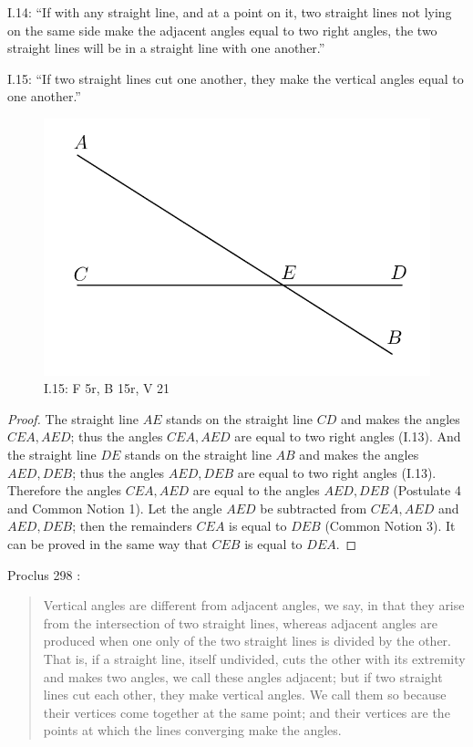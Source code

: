 \documentclass{article}
\begin{document}
I.14: ``If with any straight line, and at a point on it, two straight lines
not lying on the same side make the adjacent angles equal to
two right angles, the two straight lines will be in a straight line with one another.''

I.15: ``If two straight lines cut one another, they make the vertical
angles equal to one another.''

\begin{figure}
\begin{center}
\includegraphics[width=\textwidth]{I15.png}
\end{center}
\caption{I.15: F 5r, B 15r, V 21}
\label{I15}
\end{figure}

\begin{proof}
The straight line $AE$ stands on the straight line $CD$ and makes the angles
$CEA,AED$; thus the angles $CEA,AED$ are equal to two right angles (I.13).
And the straight line $DE$ stands on the straight line $AB$ and makes the angles
$AED,DEB$; thus the angles $AED,DEB$ are equal to two right angles (I.13).
Therefore the angles $CEA,AED$ are equal to the angles $AED,DEB$ (Postulate 4 and Common Notion 1).
Let the angle $AED$ be subtracted from $CEA,AED$ and $AED,DEB$; then the remainders
$CEA$ is equal to $DEB$ (Common Notion 3).
It can be proved in the same way that  $CEB$ is equal to $DEA$.
\end{proof}

Proclus 298 \cite[p.~233]{proclus}:

\begin{quote}
Vertical angles are different from adjacent angles, we say,
in that they arise from the intersection of two straight lines,
whereas adjacent angles are produced when one only of the
two straight lines is divided by the other. That is, if a straight
line, itself undivided, cuts the other with its extremity and
makes two angles, we call these angles adjacent; but if two
straight lines cut each other, they make vertical angles. We
call them so because their vertices come together at the same
point; and their vertices are the points at which the lines
converging make the angles.
\end{quote}
\end{document}
